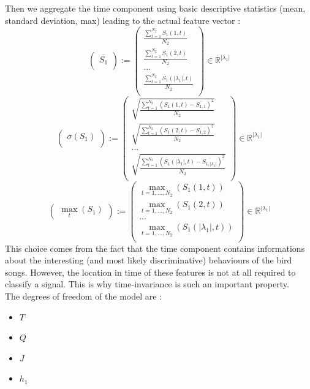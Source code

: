 \documentclass[a4paper]{report}
\begin{document}
Then we aggregate the time component using basic descriptive statistics (mean, standard deviation, max) leading to the actual feature vector :
\[
\left(
\begin{matrix}
\overline{S_1}\\
\end{matrix}
\right)
:=
\left(
\begin{matrix}
\frac{\sum_{t=1}^{N_2} S_{1}(1,t)}{N_2}\\
\frac{\sum_{t=1}^{N_2} S_{1}(2,t)}{N_2}\\
...\\
\frac{\sum_{t=1}^{N_2} S_{1}(|\lambda_1|,t)}{N_2}\\
\end{matrix}
\right) \in \mathbb{R}^{|\lambda_1|}
\]
\[
\left(
\begin{matrix}
\sigma(S_1)\\
\end{matrix}
\right)
:=
\left(
\begin{matrix}
\sqrt{\frac{\sum_{t=1}^{N_2} \left( S_{1}(1,t)-\overline{S_{1,1}}\right)^2}{N_2}}\\
\sqrt{\frac{\sum_{t=1}^{N_2}\left(S_{1}(2,t)-\overline{S_{1,2}}\right)^2}{N_2}}\\
...\\
\sqrt{\frac{\sum_{t=1}^{N_2}\left(S_{1}(|\lambda_1|,t)-\overline{S_{1,|\lambda_1|}}\right)^2}{N_2}}\\
\end{matrix}
\right) \in \mathbb{R}^{|\lambda_1|}
\]
\[
\left(
\begin{matrix}
\max_t(S_1)
\end{matrix}
\right)
:=
\left(
\begin{matrix}
\max_{t=1,...,N_2}(S_{1}(1,t))\\
\max_{t=1,...,N_2}(S_{1}(2,t))\\
...\\
\max_{t=1,...,N_2}(S_{1}(| \lambda_1|,t))\\
\end{matrix}
\right) \in \mathbb{R}^{|\lambda_1|}
\]
This choice comes from the fact that the time component contains informations about the interesting (and most likely discriminative) behaviours of the bird songs. However, the location in time of these features is not at all required to classify a signal. This is why time-invariance is such an important property.
\\
The degrees of freedom of the model are : 
\begin{itemize}
\item $T$
\item $Q$
\item $J$
\item $h_1$
\end{itemize}
\end{document}
